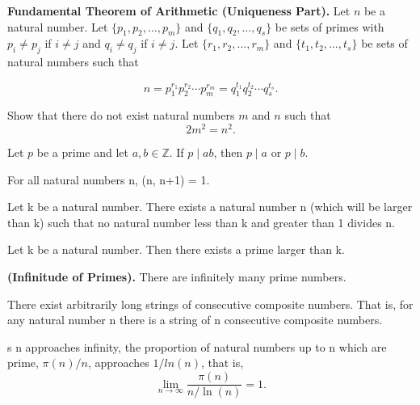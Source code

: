 \documentclass{article}
\theoremstyle{definition}
\newenvironment{manualtheorem}[1]{%
  \renewcommand{\thetheorem}{#1}%
  \theorem%
}{%
  \endtheorem%
}
\begin{document}
\begin{manualtheorem}{2.9}
	\textbf{Fundamental Theorem of Arithmetic (Uniqueness Part).}
	Let $n$ be a natural number. Let $\{p_{1}, p_{2}, \ldots, p_{m}\}$ and $\{q_{1}, q_{2}, \ldots, q_{s}\}$ be sets of primes with $p_{i} \neq p_{j}$ if $i \neq j$ and $q_{i} \neq q_{j}$ if $i \neq j$. Let $\{r_{1}, r_{2}, \ldots, r_{m}\}$ and $\{t_{1}, t_{2}, \ldots, t_{s}\}$ be sets of natural numbers such that
	
	\[
		n = p_{1}^{r_{1}} p_{2}^{r_{2}} \cdots p_{m}^{r_{m}}
		  = q_{1}^{t_{1}} q_{2}^{t_{2}} \cdots q_{s}^{t_{s}}.
	\]
\end{manualtheorem}

\begin{manualtheorem}{2.19}
Show that there do not exist natural numbers $m$ and $n$ such that
\[
2m^2 = n^2.
\]
\end{manualtheorem}

\begin{manualtheorem}{2.27}
Let $p$ be a prime and let $a, b \in \mathbb{Z}$. If $p \mid ab$, then $p \mid a$ or $p \mid b$.
\end{manualtheorem}

\begin{manualtheorem}{2.32}
	For all natural numbers n, (n, n+1) = 1.
\end{manualtheorem}

\begin{manualtheorem}{2.33}
	Let k be a natural number. There exists a natural number n (which will be larger than k) such that no natural number less than k and greater than 1 divides n.
\end{manualtheorem}
\begin{manualtheorem}{2.34}
	Let k be a natural number. Then there exists a prime larger than
	k.
\end{manualtheorem}
\begin{manualtheorem}{2.35}

	\textbf{(Infinitude of Primes).} There are infinitely many prime numbers.
\end{manualtheorem}

\begin{manualtheorem}{2.46}
	There exist arbitrarily long strings of consecutive composite numbers. That is, for any natural number n there is a string of n consecutive composite
	numbers.
\end{manualtheorem}

\begin{manualtheorem}
	As n approaches infinity, the proportion of natural numbers up to n which are prime, $\pi (n)/n$,
	approaches $1 / ln(n)$, that is,
	\[
		\lim_{n \to \infty} \frac{\pi(n)}{n / \ln(n)} = 1.
	\]
\end{manualtheorem}
\end{document}
